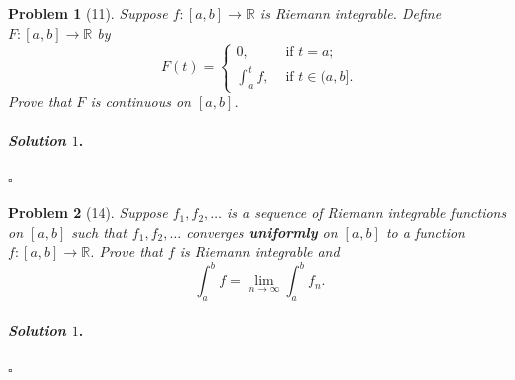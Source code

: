 \documentclass[reqno]{amsart}
\theoremstyle{plain}
\newtheorem{problem}{Problem}
\theoremstyle{definition}
\newenvironment{solution1}{\paragraph{\emph{Solution $1$}.}}{\hfill$\square$}
\begin{document}
\begin{problem}[11]
Suppose $f:[a,b] \rightarrow \mathbb{R}$ is Riemann integrable.  Define $F:[a,b] \rightarrow \mathbb{R}$ by
\begin{equation*}
F(t) = 
\begin{cases}
0, & \text{ if } t = a;\\
\int_{a}^{t}f, & \text{ if } t \in (a,b].
\end{cases}
\end{equation*}
Prove that $F$ is continuous on $[a,b]$.
\end{problem}
\begin{solution1}

\end{solution1}



\begin{problem}[14]
Suppose $f_{1},f_{2},\ldots$ is a sequence of Riemann integrable functions on $[a,b]$ such that $f_{1},f_{2},\ldots$ converges {\bfseries uniformly} on $[a,b]$ to a function $f:[a,b] \rightarrow \mathbb{R}$.  Prove that $f$ is Riemann integrable and
$$\int_{a}^{b}f = \lim_{n \to \infty} \int_{a}^{b}f_{n}. $$
\end{problem}

\begin{solution1}

\end{solution1}
\end{document}
